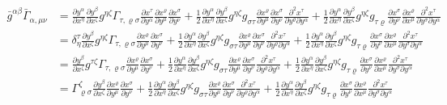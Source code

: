 \begin{align*}
\bar g^{\alpha\beta}
\bar\Gamma_{\alpha,\mu\nu}
&=
\frac{\partial y^\alpha}{\partial x^\eta}
\frac{\partial y^\beta}{\partial x^\zeta}
g^{\eta\zeta}
\Gamma_{\tau,\varrho\sigma}
\frac{\partial x^\tau}{\partial y^\alpha}
\frac{\partial x^\varrho}{\partial y^\mu}
\frac{\partial x^\sigma}{\partial y^\nu}
+
\frac12
\frac{\partial y^\alpha}{\partial x^\eta}
\frac{\partial y^\beta}{\partial x^\zeta}
g^{\eta\zeta}
g_{\sigma\tau}
\frac{\partial x^\varrho}{\partial y^\mu}
\frac{\partial x^\sigma}{\partial y^\nu}
\frac{\partial^2 x^\tau}{\partial y^\varrho\partial y^\alpha}
+
\frac12
\frac{\partial y^\alpha}{\partial x^\eta}
\frac{\partial y^\beta}{\partial x^\zeta}
g^{\eta\zeta}
g_{\tau\varrho}
\frac{\partial x^\sigma}{\partial y^\nu}
\frac{\partial x^\varrho}{\partial x^\mu}
\frac{\partial^2 x^\tau}{\partial y^\sigma\partial y^\alpha}
\\
&=
\delta^\tau_\eta
\frac{\partial y^\beta}{\partial x^\zeta}
g^{\eta\zeta}
\Gamma_{\tau,\varrho\sigma}
\frac{\partial x^\varrho}{\partial y^\mu}
\frac{\partial x^\sigma}{\partial y^\nu}
+
\frac12
\frac{\partial y^\alpha}{\partial x^\eta}
\frac{\partial y^\beta}{\partial x^\zeta}
g^{\eta\zeta}
g_{\sigma\tau}
\frac{\partial x^\varrho}{\partial y^\mu}
\frac{\partial x^\sigma}{\partial y^\nu}
\frac{\partial^2 x^\tau}{\partial y^\varrho\partial y^\alpha}
+
\frac12
\frac{\partial y^\alpha}{\partial x^\eta}
\frac{\partial y^\beta}{\partial x^\zeta}
g^{\eta\zeta}
g_{\tau\varrho}
\frac{\partial x^\sigma}{\partial y^\nu}
\frac{\partial x^\varrho}{\partial x^\mu}
\frac{\partial^2 x^\tau}{\partial y^\sigma\partial y^\alpha}
\\
&=
\frac{\partial y^\beta}{\partial x^\zeta}
g^{\tau\zeta}
\Gamma_{\tau,\varrho\sigma}
\frac{\partial x^\varrho}{\partial y^\mu}
\frac{\partial x^\sigma}{\partial y^\nu}
+
\frac12
\frac{\partial y^\alpha}{\partial x^\eta}
\frac{\partial y^\beta}{\partial x^\zeta}
g^{\eta\zeta}
g_{\sigma\tau}
\frac{\partial x^\varrho}{\partial y^\mu}
\frac{\partial x^\sigma}{\partial y^\nu}
\frac{\partial^2 x^\tau}{\partial y^\varrho\partial y^\alpha}
+
\frac12
\frac{\partial y^\alpha}{\partial x^\eta}
\frac{\partial y^\beta}{\partial x^\zeta}
g^{\eta\zeta}
g_{\tau\varrho}
\frac{\partial x^\sigma}{\partial y^\nu}
\frac{\partial x^\varrho}{\partial x^\mu}
\frac{\partial^2 x^\tau}{\partial y^\sigma\partial y^\alpha}
\\
&=
\Gamma^\zeta_{\varrho\sigma}
\frac{\partial y^\beta}{\partial x^\zeta}
\frac{\partial x^\varrho}{\partial y^\mu}
\frac{\partial x^\sigma}{\partial y^\nu}
+
\frac12
\frac{\partial y^\alpha}{\partial x^\eta}
\frac{\partial y^\beta}{\partial x^\zeta}
g^{\eta\zeta}
g_{\sigma\tau}
\frac{\partial x^\varrho}{\partial y^\mu}
\frac{\partial x^\sigma}{\partial y^\nu}
\frac{\partial^2 x^\tau}{\partial y^\varrho\partial y^\alpha}
+
\frac12
\frac{\partial y^\alpha}{\partial x^\eta}
\frac{\partial y^\beta}{\partial x^\zeta}
g^{\eta\zeta}
g_{\tau\varrho}
\frac{\partial x^\sigma}{\partial y^\nu}
\frac{\partial x^\varrho}{\partial x^\mu}
\frac{\partial^2 x^\tau}{\partial y^\sigma\partial y^\alpha}
\end{align*}



